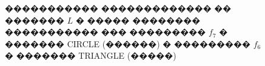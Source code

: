 \documentclass[a4paper]{article}
\begin{document}
\begin{figure}[!h]
\begin{minipage}[h]{0.49\linewidth}
  \end{minipage}
  \caption{����������� ������������� �� ������� $L$ � ����� �������� ����������� ��� ��������� $f_7$ � ������� CIRCLE (������) �  ��������� $f_6$ � ������� TRIANGLE (�����)}
  \label{r1}
\end{figure}
\end{document}
